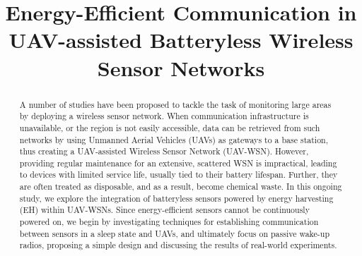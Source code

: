 \documentclass[conference]{IEEEtran}
\begin{document}
\title{Energy-Efficient Communication in UAV-assisted Batteryless Wireless Sensor Networks}

\author{
  \and
  \and
  \and
}

\maketitle

\begin{abstract}
  A number of studies have been proposed to tackle the task of monitoring large areas by deploying a wireless sensor network. When communication infrastructure is unavailable, or the region is not easily accessible, data can be retrieved from such networks by using Unmanned Aerial Vehicles (UAVs) as gateways to a base station, thus creating a UAV-assisted Wireless Sensor Network (UAV-WSN). However, providing regular maintenance for an extensive, scattered WSN is impractical, leading to devices with limited service life, usually tied to their battery lifespan. Further, they are often treated as disposable, and as a result, become chemical waste. In this ongoing study, we explore the integration of batteryless sensors powered by energy harvesting (EH) within UAV-WSNs. Since energy-efficient sensors cannot be continuously powered on, we begin by investigating techniques for establishing communication between sensors in a sleep state and UAVs, and ultimately focus on passive wake-up radios, proposing a simple design and discussing the results of real-world experiments.
\end{abstract}
\end{document}
